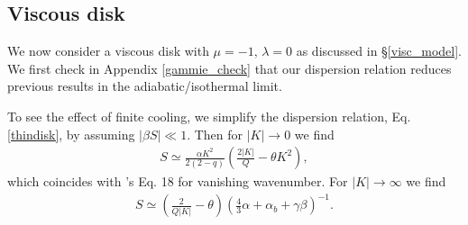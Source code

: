
%

\subsection{Viscous disk}\label{2dvisc}
We now consider a viscous disk with 
$\mu=-1,\,\lambda=0$ as discussed in \S\ref{visc_model}. We first
check in Appendix \ref{gammie_check} that our dispersion relation
reduces previous results in the adiabatic/isothermal limit.  

To see the effect of finite cooling, we simplify the dispersion relation,
Eq. \ref{thindisk}, by assuming $|\beta S|\ll 1$. Then  
for $|K| \to 0$ we find
\begin{align}\label{gammie_smallk}
  S\simeq \frac{\alpha K^2}{2(2-q)}\left(\frac{2|K|}{Q} - \theta
  K^2\right), 
\end{align}
which coincides with \citeauthor{gammie96}'s Eq. 18 for vanishing
wavenumber. For $|K|\to\infty$ we find
\begin{align}\label{gammie_bigk}
  S \simeq\left(\frac{2}{Q|K|} - \theta\right)\left(\frac{4}{3}\alpha + 
  \alpha_b + \gamma\beta\right)^{-1}.
\end{align}



